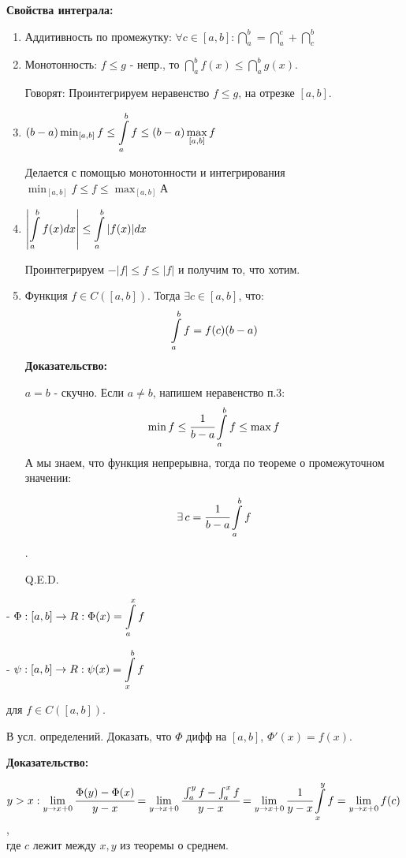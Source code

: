 \textbf{Свойства интеграла:}
\begin{enumerate}
    \item Аддитивность по промежутку: $\forall c \in [a,b]:\dint\limits_{a}^b =\dint\limits_{a}^c + \dint\limits_{c}^b $
    \item Монотонность: $f\leq g$ - непр., то $\dint\limits_{a}^b f(x)\leq \dint\limits_{a}^b g(x)$. 

    Говорят: Проинтегрируем неравенство $f\leq g$, на отрезке $[a,b]$.

    \item $(b-a)\min_{[a,b]} f \leq\displaystyle\int\limits_{a}^{b}f\leq (b-a)\max_{[a,b]}f$

    Делается с помощью монотонности и интегрирования $\min_{[a,b]}f\leq f\leq\max_{[a,b]}$А

    \item $\left|\displaystyle\int\limits_{a}^{b}f(x)dx\right|\leq \displaystyle\int\limits_{a}^{b}|f(x)|dx$

    Проинтегрируем $-|f|\leq f\leq |f|$ и получим то, что хотим.

    \item {}

    Функция $f \in C([a,b])$. Тогда $\exists c \in [a,b]$, что:
    $$\displaystyle\int\limits_{a}^{b}f = f(c)(b-a)$$
    \textbf{Доказательство:} 
    
    $a=b$ - скучно. Если $a\neq b$, напишем неравенство п.3:
    $$\min f\leq \cfrac{1}{b-a}\displaystyle\int\limits_{a}^{b}f\leq \max f$$ А мы знаем, что функция непрерывна, тогда по теореме о промежуточном значении:
    
    $$\exists \, c  = \cfrac{1}{b-a}\displaystyle\int\limits_{a}^{b}f$$. 
    
    \hfill Q.E.D.
\end{enumerate}

 -  $\Phi:[a,b] \rightarrow R: \Phi(x)= \displaystyle\int\limits_{a}^{x}f$

 -  $\psi:[a,b] \rightarrow R: \psi(x)= \displaystyle\int\limits_{x}^{b}f$

для $f\in C([a,b])$.


В усл. определений. Доказать, что $\Phi$ дифф на $[a,b]$, $\Phi'(x)=f(x)$.

\textbf{Доказательство:}

$y> x: \lim\limits_{y \rightarrow x+0} \cfrac{\Phi(y)-\Phi(x)}{y-x} = \lim\limits_{y \rightarrow x+0} \cfrac{\int_a^y f - \int_a^x f}{y-x} =\lim\limits_{y \rightarrow x+0} \cfrac{1}{y-x} \displaystyle\int\limits_{x}^{y}f =\lim_{y\rightarrow x+0} f(c)$, \\
где $c$ лежит между $x,y$ из теоремы о среднем.

